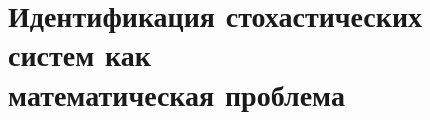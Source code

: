 












\section[Идентификация стохастических систем как математическая проблема]{%
  Идентификация стохастических систем как \\
  математическая проблема}

